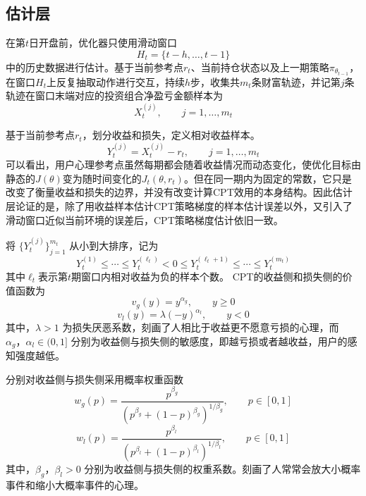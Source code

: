 \documentclass{sufethesismas}
\begin{document}
\subsection{估计层}
在第$t$日开盘前，优化器只使用滑动窗口
\begin{equation}
H_t=\{t-h,\dots,t-1\}
\end{equation}
中的历史数据进行估计。基于当前参考点$r_t$、当前持仓状态以及上一期策略$\pi_{\theta_{t-1}}$，在窗口$H_t$上反复抽取动作进行交互，持续$h$步，收集共$m_t$条财富轨迹，并记第$j$条轨迹在窗口末端对应的投资组合净盈亏金额样本为
\begin{equation}
X_t^{(j)}, \qquad j=1,\dots,m_t
\end{equation}

基于当前参考点$r_t$，划分收益和损失，定义相对收益样本。
\begin{equation}
Y_t^{(j)}=X_t^{(j)}-r_t, \qquad j=1,\dots,m_t
\end{equation}
可以看出，用户心理参考点虽然每期都会随着收益情况而动态变化，使优化目标由静态的$J(\theta)$变为随时间变化的$J_t(\theta,r_t)$。但在同一期内为固定的常数，它只是改变了衡量收益和损失的边界，并没有改变计算CPT效用的本身结构。因此估计层论证的是，除了用收益样本估计CPT策略梯度的样本估计误差以外，又引入了滑动窗口近似当前环境的误差后，CPT策略梯度估计依旧一致。

将 $\{Y_t^{(j)}\}_{j=1}^{m_t}$ 从小到大排序，记为
\begin{equation}
Y_t^{(1)}\leq \cdots \leq Y_t^{(\ell_t)} < 0 \leq Y_t^{(\ell_t+1)} \leq \cdots \leq Y_t^{(m_t)}
\end{equation}
其中$\ell_t$表示第$t$期窗口内相对收益为负的样本个数。
CPT的收益侧和损失侧的价值函数为
\begin{equation}
v_g(y)
=y^{\alpha_g},
\qquad
y\ge 0
\end{equation}
\begin{equation}
v_l(y)
=\lambda (-y)^{\alpha_l},  
\qquad
y<0
\end{equation}
其中，$\lambda>1$ 为损失厌恶系数，刻画了人相比于收益更不愿意亏损的心理，而$\alpha_g，\alpha_l\in(0,1]$ 分别为收益侧与损失侧的敏感度，即越亏损或者越收益，用户的感知强度越低。

分别对收益侧与损失侧采用概率权重函数
\begin{equation}
w_g(p)
=
\frac{p^{\beta_g}}
{\left(p^{\beta_g}+(1-p)^{\beta_g}\right)^{1/\beta_g}},
\qquad
p\in[0,1]
\end{equation}
\begin{equation}
w_l(p)
=
\frac{p^{\beta_l}}
{\left(p^{\beta_l}+(1-p)^{\beta_l}\right)^{1/\beta_l}},
\qquad
p\in[0,1]
\end{equation}
其中，$\beta_g，\beta_l>0$ 分别为收益侧与损失侧的权重系数。刻画了人常常会放大小概率事件和缩小大概率事件的心理。
\end{document}
